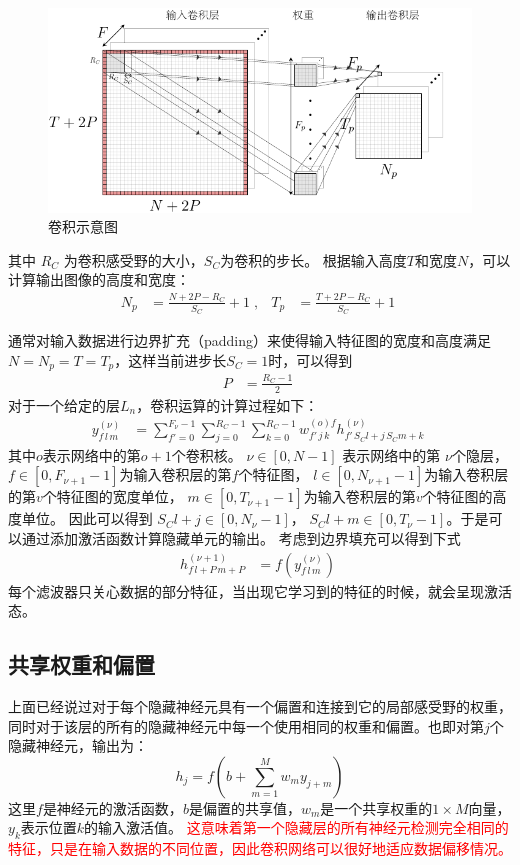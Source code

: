 
\begin{figure}[!t]
	\centering
  \includegraphics[width=\textwidth]{figures/networks/conv}
	\caption{卷积示意图}
	\label{fig:conv}
\end{figure}

其中 $R_C$ 为卷积感受野的大小，$S_C$为卷积的步长。
根据输入高度$ T $和宽度$ N $，可以计算输出图像的高度和宽度：
\begin{align}
  N_p&=\frac{N+2P-R_C}{S_C}+1 \;,&
  T_p&=\frac{T+2P-R_C}{S_C}+1\;
\end{align}

通常对输入数据进行边界扩充（padding）来使得输入特征图的宽度和高度满足$ N = N_p = T = T_p $，这样当前进步长$ S_C = 1 $时，可以得到
\begin{align}
P&=\frac{R_C-1}{2}\;
\end{align}
对于一个给定的层$ L_n $，卷积运算的计算过程如下：
\begin{align}
y_{f\,l\,m}^{(\nu)}&=\sum^{F_\nu-1}_{f'=0}\sum^{R_C-1}_{j=0}\sum^{R_C-1}_{k=0}
%
w^{(o)f}_{f'\,j\,k}h^{(\nu)}_{f'\,S_Cl+j\,S_Cm+k}\;
\end{align}
其中$ o $表示网络中的第$ o + 1 $个卷积核。
$\nu \in [0,N-1 ]$ 表示网络中的第 $\nu$个隐层，$f\in[0,F_{\nu+1}-1]$为输入卷积层的第$f$个特征图， $l\in[0,N_{\nu+1}-1 ]$为输入卷积层的第$v$个特征图的宽度单位， $m\in[0,T_{\nu+1}-1 ]$为输入卷积层的第$v$个特征图的高度单位。 因此可以得到 $S_Cl+j\in[0,N_\nu-1 ]$， $S_Cl+m\in[0,T_\nu-1 ]$。于是可以通过添加激活函数计算隐藏单元的输出。
考虑到边界填充可以得到下式
\begin{align}
h_{f\,l+P\,m+P}^{(\nu+1)}&=f\left(y_{f\,l\,m}^{(\nu)}\right)\;
\end{align}
每个滤波器只关心数据的部分特征，当出现它学习到的特征的时候，就会呈现激活态。

\subsection{共享权重和偏置}
上面已经说过对于每个隐藏神经元具有一个偏置和连接到它的局部感受野的权重，同时对于该层的所有的隐藏神经元中每一个使用相同的权重和偏置。也即对第$j$个隐藏神经元，输出为：
\begin{equation}
  h_j = f(b+\sum_{m=1}^M w_m y_{j+m})
\end{equation}
这里$f$是神经元的激活函数，$b$是偏置的共享值，$w_m$是一个共享权重的$1\times M$向量，$y_k$表示位置$k$的输入激活值。
\textcolor{red}{这意味着第一个隐藏层的所有神经元检测完全相同的特征，只是在输入数据的不同位置，因此卷积网络可以很好地适应数据偏移情况。}

